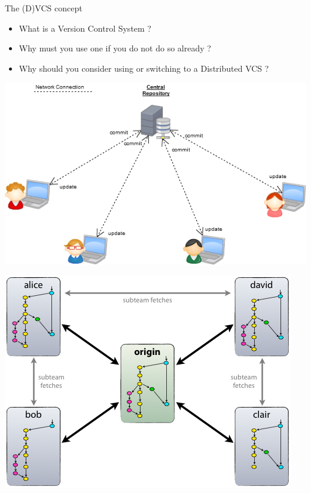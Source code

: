 \documentclass{beamer}
\begin{document}
\begin{frame}{The (D)VCS concept}
    \begin{itemize}
        \item What is a Version Control System ?
        \pause
        \item Why must you use one if you do not do so already ?
        \pause
        \item Why should you consider using or switching to a Distributed VCS ?
    \end{itemize}
    \begin{minipage}{0.4\textwidth}
    \begin{flushleft}
    \includegraphics[width=\textwidth]{VCS.png}
    \end{flushleft}
    \end{minipage}
    \hfill\vrule\hfill
    \begin{minipage}{0.4\textwidth}
    \begin{flushright}
    \includegraphics[width=\textwidth]{DVCS.png}

\end{flushright}
\end{minipage}
\end{frame}
\end{document}
